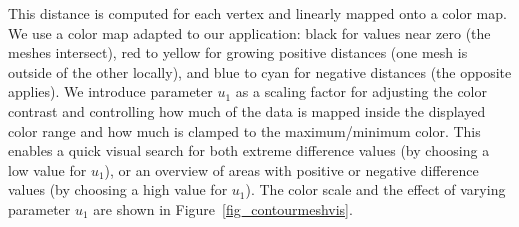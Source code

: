%
This distance is computed for each vertex and linearly mapped onto a color map. 
%
We use a color map adapted to our application: black for values near
zero (the meshes intersect), red to yellow for growing positive distances
(one mesh is outside of the other locally), and blue to cyan for negative
distances (the opposite applies). We introduce parameter $u_1$ as a scaling factor
for adjusting the color contrast and controlling how much of the data is mapped
inside the displayed color range and how much is clamped to the maximum/minimum
color. This enables a quick visual search for both extreme difference values (by
choosing a low value for $u_1$), or an overview of areas with positive or
negative difference values (by choosing a high value for $u_1$). The color scale
and the effect of varying parameter $u_1$ are shown in
Figure~\ref{fig_contourmeshvis}.

